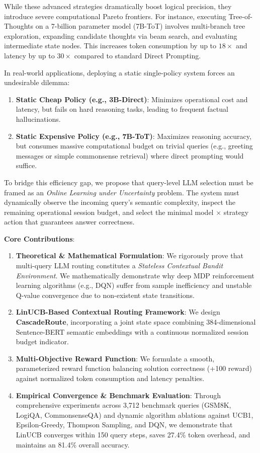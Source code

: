 \documentclass{article}
\begin{document}
While these advanced strategies dramatically boost logical precision, they introduce severe computational Pareto frontiers. For instance, executing Tree-of-Thoughts on a 7-billion parameter model (7B-ToT) involves multi-branch tree exploration, expanding candidate thoughts via beam search, and evaluating intermediate state nodes. This increases token consumption by up to $18\times$ and latency by up to $30\times$ compared to standard Direct Prompting.

In real-world applications, deploying a static single-policy system forces an undesirable dilemma:
\begin{enumerate}
    \item \textbf{Static Cheap Policy (e.g., 3B-Direct)}: Minimizes operational cost and latency, but fails on hard reasoning tasks, leading to frequent factual hallucinations.
    \item \textbf{Static Expensive Policy (e.g., 7B-ToT)}: Maximizes reasoning accuracy, but consumes massive computational budget on trivial queries (e.g., greeting messages or simple commonsense retrieval) where direct prompting would suffice.
\end{enumerate}

To bridge this efficiency gap, we propose that query-level LLM selection must be framed as an \textit{Online Learning under Uncertainty} problem. The system must dynamically observe the incoming query's semantic complexity, inspect the remaining operational session budget, and select the minimal model $\times$ strategy action that guarantees answer correctness.

\textbf{Core Contributions}:
\begin{enumerate}
    \item \textbf{Theoretical & Mathematical Formulation}: We rigorously prove that multi-query LLM routing constitutes a \textit{Stateless Contextual Bandit Environment}. We mathematically demonstrate why deep MDP reinforcement learning algorithms (e.g., DQN) suffer from sample inefficiency and unstable Q-value convergence due to non-existent state transitions.
    \item \textbf{LinUCB-Based Contextual Routing Framework}: We design \textbf{CascadeRoute}, incorporating a joint state space combining 384-dimensional Sentence-BERT semantic embeddings with a continuous normalized session budget indicator.
    \item \textbf{Multi-Objective Reward Function}: We formulate a smooth, parameterized reward function balancing solution correctness (+100 reward) against normalized token consumption and latency penalties.
    \item \textbf{Empirical Convergence \& Benchmark Evaluation}: Through comprehensive experiments across 3,712 benchmark queries (GSM8K, LogiQA, CommonsenseQA) and dynamic algorithm ablations against UCB1, Epsilon-Greedy, Thompson Sampling, and DQN, we demonstrate that LinUCB converges within 150 query steps, saves 27.4\% token overhead, and maintains an 81.4\% overall accuracy.
\end{enumerate}
\end{document}
